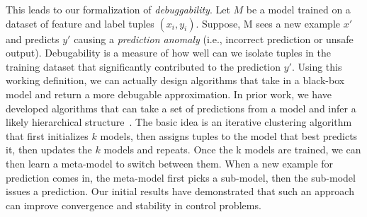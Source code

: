 This leads to our formalization of \emph{debuggability}.
Let $M$ be a model trained on a dataset of feature and label tuples $(x_i,y_i)$.
Suppose, M sees a new example $x'$ and predicts $y'$ causing a \emph{prediction anomaly} (i.e., incorrect prediction or unsafe output).
Debugability is a measure of how well can we isolate tuples in the training dataset that significantly contributed to the prediction $y'$.
Using this working definition, we can actually design algorithms that take in a black-box model and return a more debugable approximation.
In prior work, we have developed algorithms that can take a set of predictions from a model and infer a likely hierarchical structure~\cite{DBLP:journals/corr/KrishnanGLMPG16, Krishnan17}.
The basic idea is an iterative clustering algorithm that first initializes $k$ models, then assigns tuples to the model that best predicts it, then updates the $k$ models and repeats.
Once the k models are trained, we can then learn a meta-model to switch between them.
When a new example for prediction comes in, the meta-model first picks a sub-model, then the sub-model issues a prediction.
Our initial results have demonstrated that such an approach can improve convergence and stability in control problems.





























